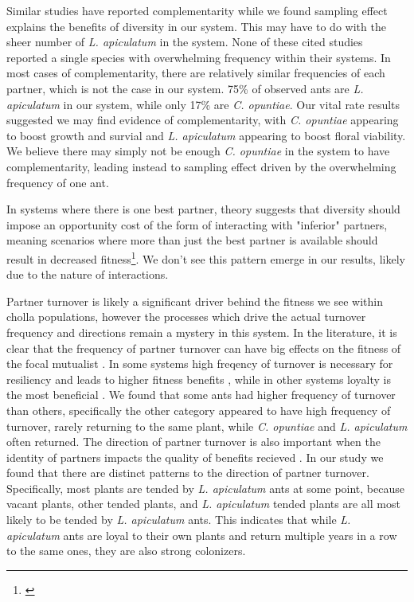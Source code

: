 \documentclass[11pt]{article}
\newcommand{\ali}[2]{{\color{blue}{#1}}\footnote{\textit{\color{blue}{#2}}}}
\begin{document}
Similar studies have reported complementarity \citep{Palmer2010,Rezende2007,Hooper2005,Cardinale2007,Afkhami2021} while we found sampling effect explains the benefits of diversity in our system. 
This may have to do with the sheer number of \textit{L. apiculatum} in the system.
None of these cited studies reported a single species with overwhelming frequency within their systems.
In most cases of complementarity, there are relatively similar frequencies of each partner, which is not the case in our system. 
75\% of observed ants are \textit{L. apiculatum} in our system, while only 17\% are \textit{C. opuntiae}.
Our vital rate results suggested we may find evidence of complementarity, with \textit{C. opuntiae} appearing to boost growth and survial and \textit{L. apiculatum} appearing to boost floral viability.
We believe there may simply not be enough \textit{C. opuntiae} in the system to have complementarity, leading instead to sampling effect driven by the overwhelming frequency of one ant.


In systems where there is one best partner, theory suggests that diversity should impose an opportunity cost of the form of interacting with "inferior" partners, meaning scenarios where more than just the best partner is available should result in decreased fitness\ali{}{get a citation here}.
We don't see this pattern emerge in our results, likely due to the nature of interactions. 

Partner turnover is likely a significant driver behind the fitness we see within cholla populations, however the processes which drive the actual turnover frequency and directions remain a mystery in this system.
In the literature, it is clear that the frequency of partner turnover can have big effects on the fitness of the focal mutualist \cite{Fiala1994, Horvitz1986, Oliveira1999, Sachs2004}.
In some systems high freqency of turnover is necessary for resiliency and leads to higher fitness benefits \cite{Trojelsgaard2015}, while in other systems loyalty is the most beneficial \cite{Batstone2018}.
We found that some ants had higher frequency of turnover than others, specifically the other category appeared to have high frequency of turnover, rarely returning to the same plant, while \textit{C. opuntiae} and \textit{L. apiculatum} often returned.
The direction of partner turnover is also important when the identity of partners impacts the quality of benefits recieved \cite{Fonseca2003, Alonso1998, Dejean2008, Noe1994}.
In our study we found that there are distinct patterns to the direction of partner turnover. 
Specifically, most plants are tended by \textit{L. apiculatum} ants at some point, because vacant plants, other tended plants, and \textit{L. apiculatum} tended plants are all most likely to be tended by \textit{L. apiculatum} ants.
This indicates that while \textit{L. apiculatum} ants are loyal to their own plants and return multiple years in a row to the same ones, they are also strong colonizers. 
\end{document}
